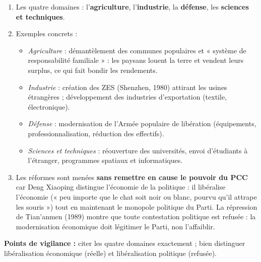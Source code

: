 \documentclass[11pt]{article}
\begin{document}
\begin{corrige}
\begin{enumerate}
\item Les quatre domaines : l'\textbf{agriculture}, l'\textbf{industrie}, la \textbf{défense}, les \textbf{sciences et techniques}.
\item Exemples concrets :
\begin{itemize}
\item \emph{Agriculture} : démantèlement des communes populaires et « système de responsabilité familiale » : les paysans louent la terre et vendent leurs surplus, ce qui fait bondir les rendements.
\item \emph{Industrie} : création des ZES (Shenzhen, 1980) attirant les usines étrangères ; développement des industries d'exportation (textile, électronique).
\item \emph{Défense} : modernisation de l'Armée populaire de libération (équipements, professionnalisation, réduction des effectifs).
\item \emph{Sciences et techniques} : réouverture des universités, envoi d'étudiants à l'étranger, programmes spatiaux et informatiques.
\end{itemize}
\item Les réformes sont menées \textbf{sans remettre en cause le pouvoir du PCC} car Deng Xiaoping distingue l'économie de la politique : il libéralise l'économie (« peu importe que le chat soit noir ou blanc, pourvu qu'il attrape les souris ») tout en maintenant le monopole politique du Parti. La répression de Tian'anmen (1989) montre que toute contestation politique est refusée : la modernisation économique doit légitimer le Parti, non l'affaiblir.
\end{enumerate}
\textbf{Points de vigilance :} citer les quatre domaines exactement ; bien distinguer libéralisation économique (réelle) et libéralisation politique (refusée).
\end{corrige}
\end{document}
